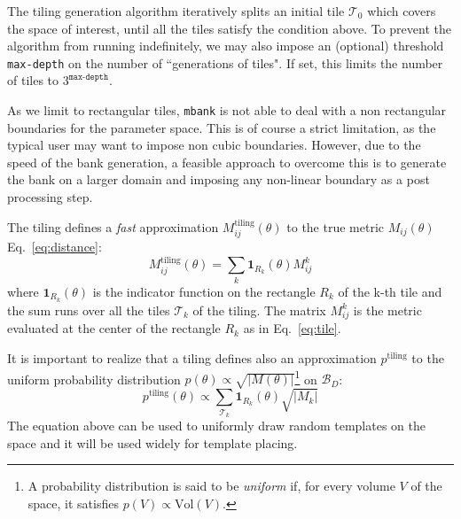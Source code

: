 \documentclass[twocolumn,showpacs,preprintnumbers,nofootinbib,prd,
superscriptaddress,10pt]{revtex4-2}
\begin{document}
The tiling generation algorithm iteratively splits an initial tile $\mathcal{T}_{0}$ which covers the space of interest, until all the tiles satisfy the condition above.
To prevent the algorithm from running indefinitely, we may also impose an (optional) threshold \texttt{max-depth} on the number of ``generations of tiles". If set, this limits the number of tiles to $3^{\texttt{max-depth}}$.

As we limit to rectangular tiles, \texttt{mbank} is not able to deal with a non rectangular boundaries for the parameter space. This is of course a strict limitation, as the typical user may want to impose non cubic boundaries. However, due to the speed of the bank generation, a feasible approach to overcome this is to generate the bank on a larger domain and imposing any non-linear boundary as a post processing step. 

The tiling defines a {\it fast} approximation $M^{\text{tiling}}_{ij}(\theta)$ to the true metric $M_{ij}(\theta)$ Eq.~\eqref{eq:distance}:
\begin{equation}\label{eq:metric_tiling}
	M^{\text{tiling}}_{ij}(\theta) = \sum_{k} \mathbf{1}_{R_k}(\theta) M^{k}_{ij}
\end{equation}
where $\mathbf{1}_{R_k}(\theta)$ is the indicator function on the rectangle $R_k$ of the k-th tile and the sum runs over all the tiles $\mathcal{T}_k$ of the tiling. The matrix $M^{k}_{ij}$ is the metric evaluated at the center of the rectangle $R_k$ as in Eq.~\eqref{eq:tile}.


It is important to realize that a tiling defines also an approximation $p^{\text{tiling}}$ to the uniform probability distribution $p(\theta) \propto \sqrt{|M(\theta)|}$\footnote{
A probability distribution is said to be {\it uniform} if, for every volume $V$ of the space, it satisfies $p(V) \propto \text{Vol}(V)$.}
on $\mathcal{B}_D$:
\begin{equation}\label{eq:tiling_pdf}
	p^{\text{tiling}}(\theta) \propto \sum_{\mathcal{T}_k} \mathbf{1}_{R_k}(\theta) \sqrt{|M_k|}
\end{equation}
The equation above can be used to uniformly draw random templates on the space and it will be used widely for template placing.
\end{document}
